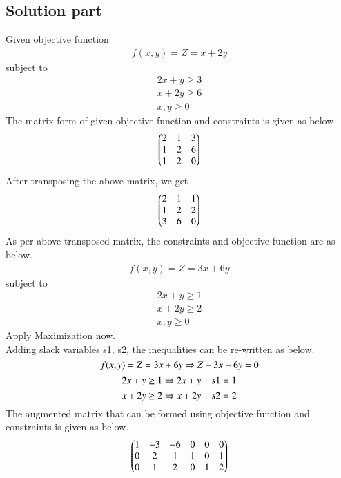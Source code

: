 \documentclass[journal,12pt,twocolumn]{IEEEtran}
\begin{document}
\subsection{Solution part}
Given objective function
\begin{align}
f(x,y) = Z = x+2y
\end{align}
subject to\\
\begin{align}
2x+y\geq 3\\
x+2y\geq 6\\
x,y\geq 0
\end{align}
The matrix form of given objective function and constraints is given as below
\begin{align}
\begin{pmatrix}2 & 1 & 3\\1 &2 &6\\1 & 2 &0\end{pmatrix}
\end{align}
After transposing the above matrix, we get
\begin{align}
\begin{pmatrix}2 & 1 & 1\\1 &2 &2\\3&6&0\end{pmatrix}
\end{align} 
As per above transposed matrix, the constraints and objective function are as below.
\begin{align}
f(x,y) = Z = 3x+6y
\end{align}
subject to\\
\begin{align}
2x+y\geq 1\\
x+2y\geq 2\\
x,y\geq 0
\end{align}
Apply Maximization now.\\
Adding slack variables s1, s2, the inequalities can be re-written as below.
\begin{equation}
f(x,y) = Z = 3x+6y\Rightarrow Z-3x-6y=0\\
\end{equation}
\begin{equation}
2x+y\geq 1\Rightarrow 2x+y+s1=1\\
\end{equation}
\begin{equation}
x+2y\geq 2\Rightarrow x+2y+s2=2\\
\end{equation}
The augmented matrix that can be formed using objective function and constraints is given as below.
\begin{align}
\begin{pmatrix}1 & -3 & -6 & 0 & 0 & 0\\0 & 2 & 1 & 1 & 0 & 1\\0 & 1 & 2 & 0 & 1 & 2\end{pmatrix}
\end{align}
\end{document}
